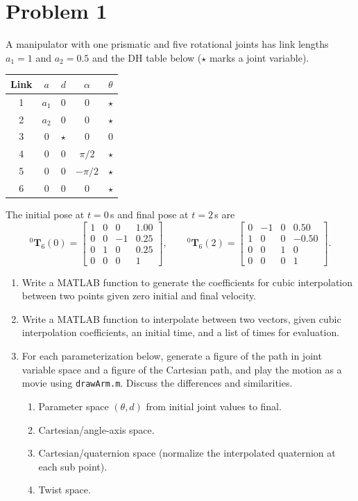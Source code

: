 \documentclass[11pt]{article}
\newcommand{\T}{\bm{T}}
\begin{document}
\section*{Problem 1}

\begin{statement}
A manipulator with one prismatic and five rotational joints has link lengths $a_1 = 1$ and $a_2 = 0.5$ and the DH table below ($\star$ marks a joint variable).
\begin{center}
\begin{tabular}{c|cccc}
Link & $a$ & $d$ & $\alpha$ & $\theta$ \\ \hline
1 & $a_1$ & 0 & 0 & $\star$ \\
2 & $a_2$ & 0 & 0 & $\star$ \\
3 & 0 & $\star$ & 0 & 0 \\
4 & 0 & 0 & $\pi/2$ & $\star$ \\
5 & 0 & 0 & $-\pi/2$ & $\star$ \\
6 & 0 & 0 & 0 & $\star$
\end{tabular}
\end{center}
The initial pose at $t=0$\,s and final pose at $t=2$\,s are
\[
{}^0\T_6(0)=\begin{bmatrix}1&0&0&1.00\\0&0&-1&0.25\\0&1&0&0.25\\0&0&0&1\end{bmatrix},\qquad
{}^0\T_6(2)=\begin{bmatrix}0&-1&0&0.50\\1&0&0&-0.50\\0&0&1&0\\0&0&0&1\end{bmatrix}.
\]
\begin{enumerate}[label=(\alph*), nosep]
\item Write a MATLAB function to generate the coefficients for cubic interpolation between two points given zero initial and final velocity.
\item Write a MATLAB function to interpolate between two vectors, given cubic interpolation coefficients, an initial time, and a list of times for evaluation.
\item For each parameterization below, generate a figure of the path in joint variable space and a figure of the Cartesian path, and play the motion as a movie using \texttt{drawArm.m}. Discuss the differences and similarities.
\begin{enumerate}[label=\roman*., nosep]
\item Parameter space $(\theta, d)$ from initial joint values to final.
\item Cartesian/angle-axis space.
\item Cartesian/quaternion space (normalize the interpolated quaternion at each sub point).
\item Twist space.
\end{enumerate}
\end{enumerate}
\end{statement}
\end{document}
